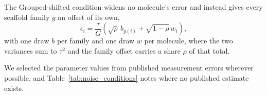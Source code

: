 The Grouped-shifted condition widens no molecule's error and instead gives every scaffold family $g$ an offset of
its own,
\begin{equation}
\epsilon_i = \frac{\tau}{G}\left(\sqrt{\rho}\,b_{g(i)} + \sqrt{1-\rho}\,w_i\right),
\label{eq:grouped_shifted}
\end{equation}
with one draw $b$ per family and one draw $w$ per molecule, where the two variances sum to $\tau^{2}$ and
the family offset carries a share $\rho$ of that total.

We selected the parameter values from published measurement errors wherever possible, and Table~\ref{tab:noise_conditions} notes where no published estimate exists.

